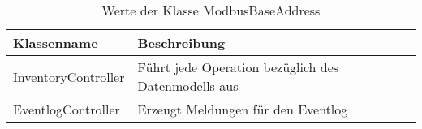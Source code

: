 \begin{table}[h]
\centering
\caption{Werte der Klasse ModbusBaseAddress}
\begin{tabular}{|l|l|}
\hline
Klassenname & Beschreibung \\
\hline
InventoryController & Führt jede Operation bezüglich des Datenmodells aus \\
\hline
EventlogController & Erzeugt Meldungen für den Eventlog\\
\hline

\hline
\end{tabular}\label{tab:Controller}
\end{table}

